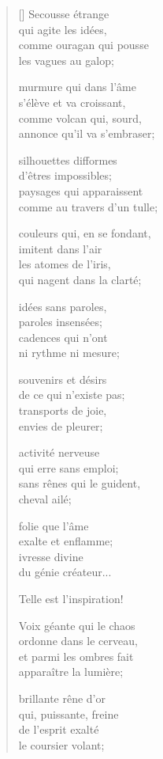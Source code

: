 \documentclass[a4paper,12pt]{book}
\begin{document}
\begin{verse}[\versewidth]
  Secousse étrange \\
  qui agite les idées, \\
  comme ouragan qui pousse \\
  les vagues au galop;

  murmure qui dans l'âme \\
  s'élève et va croissant, \\
  comme volcan qui, sourd, \\
  annonce qu'il va s'embraser;

  silhouettes difformes \\
  d'êtres impossibles; \\
  paysages qui apparaissent \\
  comme au travers d'un tulle;

  couleurs qui, en se fondant, \\
  imitent dans l'air \\
  les atomes de l'iris, \\
  qui nagent dans la clarté;

  idées sans paroles, \\
  paroles insensées; \\
  cadences qui n'ont \\
  ni rythme ni mesure;

  souvenirs et désirs \\
  de ce qui n'existe pas; \\
  transports de joie, \\
  envies de pleurer;

  activité nerveuse \\
  qui erre sans emploi; \\
  sans rênes qui le guident, \\
  cheval ailé;

  folie que l'âme \\
  exalte et enflamme; \\
  ivresse divine \\
  du génie créateur...

  Telle est l'inspiration!

  Voix géante qui le chaos \\
  ordonne dans le cerveau, \\
  et parmi les ombres fait \\
  apparaître la lumière;

  brillante rêne d'or \\
  qui, puissante, freine \\
  de l'esprit exalté \\
  le coursier volant;


\end{verse}
\end{document}
